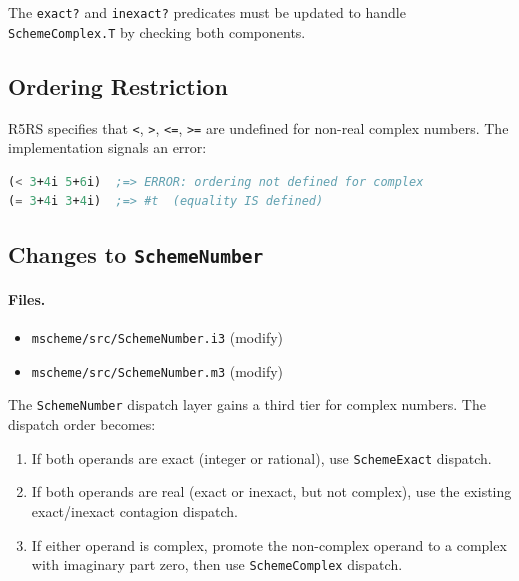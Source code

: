 \documentclass[12pt]{article}
\begin{document}
\noindent The {\tt exact?} and {\tt inexact?} predicates must be
updated to handle {\tt SchemeComplex.T} by checking both components.

\subsection{Ordering Restriction}

R5RS specifies that {\tt <}, {\tt >}, {\tt <=}, {\tt >=} are
undefined for non-real complex numbers.  The implementation signals
an error:

\begin{lstlisting}[language=Scheme]
(< 3+4i 5+6i)  ;=> ERROR: ordering not defined for complex
(= 3+4i 3+4i)  ;=> #t  (equality IS defined)
\end{lstlisting}

\subsection{Changes to {\tt SchemeNumber}}

\paragraph{Files.}
\begin{itemize}[nosep]
\item {\tt mscheme/src/SchemeNumber.i3} (modify)
\item {\tt mscheme/src/SchemeNumber.m3} (modify)
\end{itemize}

The {\tt SchemeNumber} dispatch layer gains a third tier for
complex numbers.  The dispatch order becomes:

\begin{enumerate}[nosep]
\item If both operands are exact (integer or rational), use
  {\tt SchemeExact} dispatch.
\item If both operands are real (exact or inexact, but not complex),
  use the existing exact/inexact contagion dispatch.
\item If either operand is complex, promote the non-complex operand
  to a complex with imaginary part zero, then use
  {\tt SchemeComplex} dispatch.
\end{enumerate}
\end{document}
